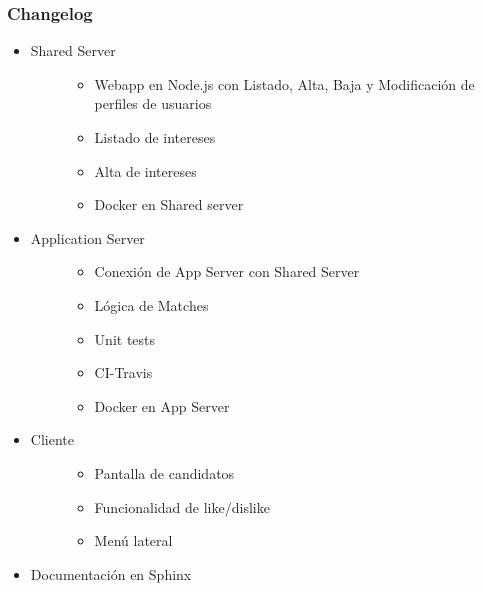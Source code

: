 \documentclass[letterpaper,10pt,english]{sphinxmanual}
\begin{document}
\subsubsection{Changelog}
\label{manuals:id1}\begin{itemize}
\item {} \begin{description}
\item[{Shared Server}] \leavevmode\begin{itemize}
\item {} 
Webapp en Node.js con Listado, Alta, Baja y Modificación de perfiles de usuarios

\item {} 
Listado de intereses

\item {} 
Alta de intereses

\item {} 
Docker en Shared server

\end{itemize}

\end{description}

\item {} \begin{description}
\item[{Application Server}] \leavevmode\begin{itemize}
\item {} 
Conexión de App Server con Shared Server

\item {} 
Lógica de Matches

\item {} 
Unit tests

\item {} 
CI-Travis

\item {} 
Docker en App Server

\end{itemize}

\end{description}

\item {} \begin{description}
\item[{Cliente}] \leavevmode\begin{itemize}
\item {} 
Pantalla de candidatos

\item {} 
Funcionalidad de like/dislike

\item {} 
Menú lateral

\end{itemize}

\end{description}

\item {} 
Documentación en Sphinx

\end{itemize}
\end{document}

